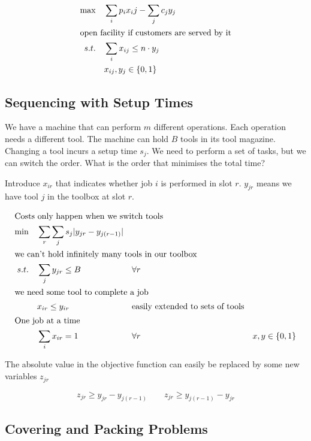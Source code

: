 \begin{align*}
\max \quad & \sum_i p_i x_ij - \sum_{j} c_j y_j\\
\intertext{open facility if customers are served by it}
s.t. \quad & \sum_{i} x_{ij} \leq n\cdot y_j\\
	& x_{ij},y_j \in \{0,1\}
\end{align*}

\subsection{Sequencing with Setup Times}

We have a machine that can perform $m$ different operations. Each operation needs a different tool. The machine can hold $B$ tools in its tool magazine. Changing a tool incurs a setup time $s_j$. We need to perform a set of tasks, but we can switch the order. What is the order that minimises the total time?

Introduce $x_{ir}$ that indicates whether job $i$ is performed in slot $r$. $y_{jr}$ means we have tool $j$ in the toolbox at slot $r$.

\begin{align*}
\intertext{Costs only happen when we switch tools}
\min \quad & \sum_r\sum_j s_j|y_{jr}-y_{j(r-1)}|\\
\intertext{we can't hold infinitely many tools in our toolbox}
s.t.\quad	& \sum_j y_{jr} \leq B && \forall r\\
\intertext{we need some tool to complete a job}
	& x_{ir} \leq y_{ir} && \text{easily extended to sets of tools}\\
\intertext{One job at a time}
	& \sum_i x_{ir} = 1 && \forall r
	& x,y\in \{0,1\}
\end{align*}

The absolute value in the objective function can easily be replaced by some new variables $z_{jr}$

\[z_{jr} \geq y_{jr} - y_{j(r-1)} \qquad z_{jr} \geq y_{j(r-1)} - y_{jr}\]

\subsection{Covering and Packing Problems}
